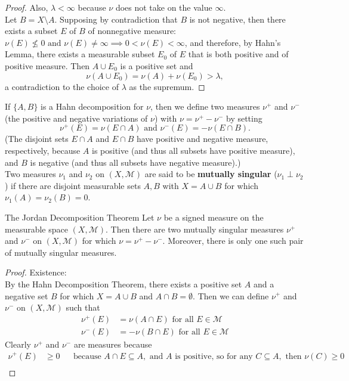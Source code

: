 \begin{flushleft}
\begin{proof}
		Also, $\lambda<\infty$ because $\nu$ does not take on the value $\infty$.
		\\Let $B=X\setminus A$.
		Supposing by contradiction that $B$ is not negative, then there exists a subset $E$ of $B$ of nonnegative measure: $\nu(E)\not\le0\text{ and }\nu(E)\neq\infty\implies 0<\nu(E)<\infty$, and therefore, by Hahn's Lemma, there exists a measurable subset $E_0$ of $E$ that is both positive and of positive measure.
		Then $A\cup E_0$ is a positive set and 
		\[
			\nu(A\cup E_0)=\nu(A)+\nu(E_0)>\lambda,
		\]
		a contradiction to the choice of $\lambda$ as the supremum.
	\end{proof}
	If $\{A,B\}$ is a Hahn decomposition for $\nu$, then we define two measures $\nu^+$ and $\nu^-$ (the positive and negative variations of $\nu$) with $\nu=\nu^+-\nu^-$ by setting
	\[
		\nu^+(E)=\nu(E\cap A)\text{ and }\nu^-(E)=-\nu(E\cap B).	
	\]
	(The disjoint sets $E\cap A$ and $E\cap B$ have positive and negative measure, respectively, because $A$ is positive (and thus all subsets have positive measure), and $B$ is negative (and thus all subsets have negative measure).) 
	\\\bigskip Two measures $\nu_1$ and $\nu_2$ on $(X,\mathcal{M})$ are said to be \textbf{mutually singular} ($\nu_1\perp\nu_2$) if there are disjoint measurable sets $A,B$ with $X=A\cup B$ for which $\nu_1(A)=\nu_2(B)=0$.
	\begin{namedthm*}{The Jordan Decomposition Theorem}
		Let $\nu$ be a signed measure on the measurable space $(X,\mathcal{M})$. 
		Then there are two mutually singular measures $\nu^+$ and $\nu^-$ on $(X,\mathcal{M})$ for which $\nu=\nu^+-\nu^-$.
		Moreover, there is only one such pair of mutually singular measures.
	\end{namedthm*}
	\begin{proof}
		Existence:
		\\By the Hahn Decomposition Theorem, there exists a positive set $A$ and a negative set $B$ for which $X=A\cup B$ and $A\cap B=\emptyset$.
		Then we can define $\nu^+$ and $\nu^-$ on $(X,\mathcal{M})$ such that
		\begin{align*}
			\nu^+(E)&=\nu(A\cap E)\text{ for all }E\in\mathcal{M}\\
			\nu^-(E)&=-\nu(B\cap E)\text{ for all }E\in\mathcal{M}
		\end{align*}
		Clearly  $\nu^+$ and $\nu^-$ are measures because 
			\begin{align*}
				\nu^+(E)&\ge0&&\text{because }A\cap E\subseteq A,\text{ and }A\text{ is positive, so for any }C\subseteq A,\text{ then }\nu(C)\ge0\\

\end{align*}
\end{proof}
\end{flushleft}
